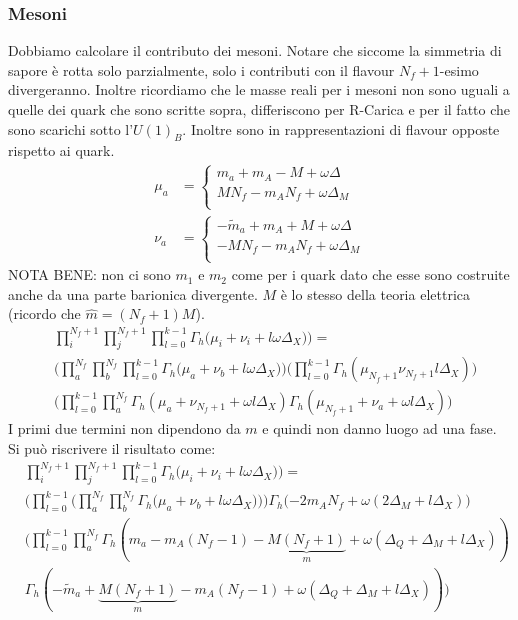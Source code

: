 \documentclass[a4paper,12pt]{article}
\begin{document}
\subsubsection{Mesoni}
Dobbiamo calcolare il contributo dei mesoni. Notare che siccome la simmetria di sapore è rotta solo parzialmente, solo i contributi con il flavour $N_f + 1$-esimo divergeranno. Inoltre ricordiamo che le masse reali per i mesoni non sono uguali a quelle dei quark che sono scritte sopra, differiscono per R-Carica e per il fatto che sono scarichi sotto l'$U(1)_B$. Inoltre sono in rappresentazioni di flavour opposte rispetto ai quark.
\begin{align*}
	\mu_a &  = \begin{cases}
	m_a + m_A - M + \omega \Delta \\
	M N_f - m_A N_f + \omega \Delta_M\\
	\end{cases}
	\\
\nu_a & = 	\begin{cases}
	- \tilde{m}_a + m_A + M + \omega \Delta \\
	- M N_f - m_A N_f + \omega \Delta_M \\
	\end{cases}
\end{align*}
NOTA BENE: non ci sono $m_1$ e $m_2$ come per i quark dato che esse sono costruite anche da una parte barionica divergente.
$M$ è lo stesso della teoria elettrica (ricordo che $\hat{m} = (N_f+1) M$).
\begin{align*}
 & \prod_i^{N_f+1} \prod_j^{N_f+1}  \prod_{l=0}^{k-1}    \Gamma_h \big( \mu_i+  \nu_i + l \omega \Delta_X) \big)  = \\ &
\bigg( \prod_a^{N_f} \prod_b^{N_f}  \prod_{l=0}^{k-1} \Gamma_h \big(   \mu_a + \nu_b + l \omega \Delta_X \big)  \bigg)   \bigg( \prod_{l=0}^{k-1} \Gamma_h( \mu_{N_f+1} \nu_{N_f+1}  l \Delta_X) \bigg) \\
&  \bigg(  \prod_{l=0}^{k-1} \prod_a^{N_f} \Gamma_h ( \mu_a + \nu_{N_f+1} + \omega l \Delta_X) \Gamma_h(  \mu_{N_f+1} + \nu_{a} + \omega l \Delta_X)  \bigg)
\end{align*}
I primi due termini non dipendono da $m$ e quindi non danno luogo ad una fase. Si può riscrivere il risultato come:
\begin{align*}
& \prod_i^{N_f+1} \prod_j^{N_f+1}  \prod_{l=0}^{k-1}   \Gamma_h \big( \mu_i+  \nu_i + l \omega \Delta_X) \big)  = \\
& \bigg(  \prod_{l=0}^{k-1}  \bigg ( \prod_a^{N_f} \prod_b^{N_f} \Gamma_h \big( \mu_a + \nu_b + l \omega \Delta_X) \big)  \bigg)\Gamma_h( - 2 m_A N_f + \omega ( 2 \Delta_M +  l \Delta_X) \bigg)  \\
 &  \bigg(  \prod_{l=0}^{k-1} \prod_a^{N_f} \Gamma_h (m_a - m_A (N_f-1) - \underbrace{M(N_f+1)}_m  + \omega ( \Delta_Q + \Delta_M + l \Delta_X))\\
 & \Gamma_h(  - \tilde{m}_a + \underbrace{M (N_f +1)}_m - m_A ( N_f-1) + \omega ( \Delta_Q + \Delta_M + l \Delta_X) ) \bigg)
\end{align*}
\end{document}
